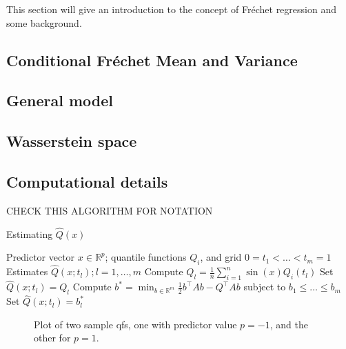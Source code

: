This section will give an introduction to the concept of Fréchet regression
and some background.

\subsection{Conditional Fréchet Mean and Variance}
\label{sec:condmean}

\subsection{General model}
\label{sec:general}

\subsection{Wasserstein space}
\label{sec:wasserstein_space}

\subsection{Computational details}
\label{sec:computation}

CHECK THIS ALGORITHM FOR NOTATION
\begin{algorithm}
    \caption{Estimating \(\hat{Q}(x)\)}
    \label{alg:quadprog}
    \begin{algorithmic}[1]
    \Require Predictor vector \( x \in \mathbb{R}^p \); quantile functions \( Q_i \), and grid \( 0 = t_1 < \ldots < t_m = 1 \)
    \Ensure Estimates \( \hat{Q}(x; t_l); l = 1, \ldots, m \)
        \State Compute \( Q_l = \frac{1}{n} \sum_{i=1}^{n} \sin(x) Q_i(t_l) \)
    \EndFor
        \State Set \( \hat{Q}(x; t_l) = Q_l \)
    \Else
        \State Compute \( b^* = \min_{b \in \mathbb{R}^m} \frac{1}{2} b^\top A b - Q^\top A b \) subject to \( b_1 \leq \ldots \leq b_m \)
        \State Set \( \hat{Q}(x; t_l) = b^*_l \)
    \EndIf
    \end{algorithmic}
\end{algorithm}

\begin{figure}[h]
    \centering
    \resizebox{1\textwidth}{!}{}
    \caption[Two sample qfs]{Plot of two sample qfs, one with predictor value $p = -1$,
    and the other for $p = 1$.}
    \label{fig:1stlastqf}
\end{figure}

